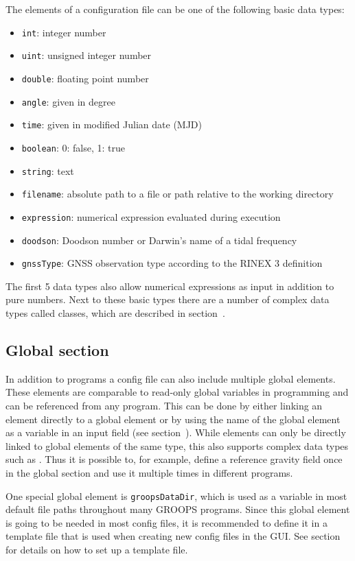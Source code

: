 The elements of a configuration file can be one of the following basic data types:
\begin{itemize}
\item \verb|int|: integer number
\item \verb|uint|: unsigned integer number
\item \verb|double|: floating point number
\item \verb|angle|: given in degree
\item \verb|time|: given in modified Julian date (MJD)
\item \verb|boolean|: 0: false, 1: true
\item \verb|string|: text
\item \verb|filename|: absolute path to a file or path relative to the working directory
\item \verb|expression|: numerical expression evaluated during execution
\item \verb|doodson|: Doodson number or Darwin's name of a tidal frequency
\item \verb|gnssType|: GNSS observation type according to the RINEX 3 definition
\end{itemize}
The first 5 data types also allow numerical expressions as input in addition to pure numbers.
Next to these basic types there are a number of complex data types called classes,
which are described in section~.

\subsection{Global section}\label{general.configFiles:globalSection}
In addition to programs a config file can also include multiple global elements.
These elements are comparable to read-only global variables in programming and can be referenced from any program.
This can be done by either linking an element directly to a global element or
by using the name of the global element as a variable in an input field (see section~).
While elements can only be directly linked to global elements of the same type, this also supports complex data types
such as . Thus it is possible to, for example, define a reference gravity field once
in the global section and use it multiple times in different programs.

One special global element is \verb|groopsDataDir|, which is used as a variable in most default
file paths throughout many GROOPS programs. Since this global element is going to be needed in
most config files, it is recommended to define it in a template file that is used when creating
new config files in the GUI. See section~
for details on how to set up a template file.

